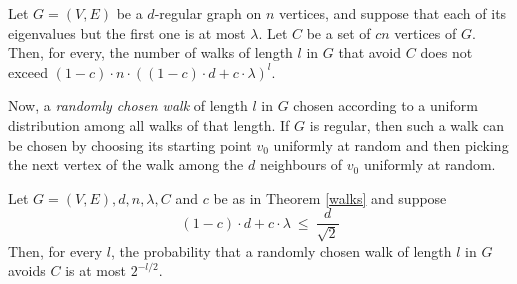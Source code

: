 \begin{theorem} \label{walks}
  Let $G = (V,E)$ be a $d$-regular graph on $n$ vertices, and suppose
  that each of its eigenvalues but the first one is at most
  $\lambda$. Let $C$ be a set of $cn$ vertices of $G$. Then, for
  every, the number of walks of length $l$ in $G$ that avoid $C$ does
  not exceed $(1 - c)\cdot n \cdot ((1 - c) \cdot d + c \cdot
  \lambda)^l$.
\end{theorem}

Now, a {\em randomly chosen walk} of length $l$ in $G$ chosen
according to a uniform distribution among all walks of that length.
If $G$ is regular, then such a walk can be chosen by choosing its
starting point $v_0$ uniformly at random and then picking the next
vertex of the walk among the $d$ neighbours of $v_0$ uniformly at
random.

\begin{corollary}
  Let $G = (V,E), d, n, \lambda, C$ and $c$ be as in Theorem
  \ref{walks} and suppose 
\[
(1 - c)\cdot d + c \cdot \lambda \ \le \ \frac{d}{\sqrt{2}}
\]
Then, for every $l$, the probability that a randomly chosen walk of
length $l$ in $G$ avoids $C$ is at most $2^{{-l}/{2}}$.
\end{corollary}




